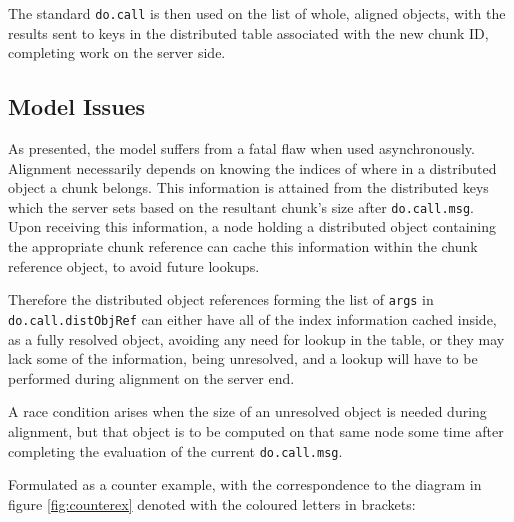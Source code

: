 \documentclass[a4paper,10pt]{article}
\begin{document}
The standard \lstinline[language=R]{do.call} is then used on the list of whole,
aligned objects, with the results sent to keys in the distributed table
associated with the new chunk ID, completing work on the server side.

\subsection{Model Issues}

As presented, the model suffers from a fatal flaw when used asynchronously.
Alignment necessarily depends on knowing the indices of where in a distributed
object a chunk belongs.
This information is attained from the distributed keys which the server sets
based on the resultant chunk's size after \lstinline[language=R]{do.call.msg}.
Upon receiving this information, a node holding a distributed object containing
the appropriate chunk reference can cache this information within the chunk
reference object, to avoid future lookups.

Therefore the distributed object references forming the list of \texttt{args}
in \lstinline[language=R]{do.call.distObjRef} can either have all of the index
information cached inside, as a fully resolved object, avoiding any need for
lookup in the table, or they may lack some of the information, being
unresolved, and a lookup will have to be performed during alignment on the
server end.

A race condition arises when the size of an unresolved object is needed during
alignment, but that object is to be computed on that same node some time after
completing the evaluation of the current \lstinline[language=R]{do.call.msg}. 


Formulated as a counter example, with the correspondence to the diagram in
figure \ref{fig:counterex} denoted with the coloured letters in brackets:
\end{document}
